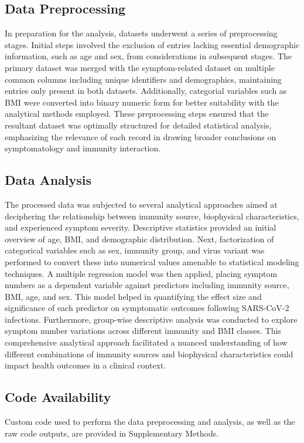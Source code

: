 \documentclass[11pt]{article}
\begin{document}
\subsection*{Data Preprocessing}
In preparation for the analysis, datasets underwent a series of preprocessing stages. Initial steps involved the exclusion of entries lacking essential demographic information, such as age and sex, from considerations in subsequent stages. The primary dataset was merged with the symptom-related dataset on multiple common columns including unique identifiers and demographics, maintaining entries only present in both datasets. Additionally, categorial variables such as BMI were converted into binary numeric form for better suitability with the analytical methods employed. These preprocessing steps ensured that the resultant dataset was optimally structured for detailed statistical analysis, emphasizing the relevance of each record in drawing broader conclusions on symptomatology and immunity interaction.

\subsection*{Data Analysis}
The processed data was subjected to several analytical approaches aimed at deciphering the relationship between immunity source, biophysical characteristics, and experienced symptom severity. Descriptive statistics provided an initial overview of age, BMI, and demographic distribution. Next, factorization of categorical variables such as sex, immunity group, and virus variant was performed to convert these into numerical values amenable to statistical modeling techniques. A multiple regression model was then applied, placing symptom numbers as a dependent variable against predictors including immunity source, BMI, age, and sex. This model helped in quantifying the effect size and significance of each predictor on symptomatic outcomes following SARS-CoV-2 infections. Furthermore, group-wise descriptive analysis was conducted to explore symptom number variations across different immunity and BMI classes. This comprehensive analytical approach facilitated a nuanced understanding of how different combinations of immunity sources and biophysical characteristics could impact health outcomes in a clinical context.\subsection*{Code Availability}

Custom code used to perform the data preprocessing and analysis, as well as the raw code outputs, are provided in Supplementary Methods.
\end{document}
